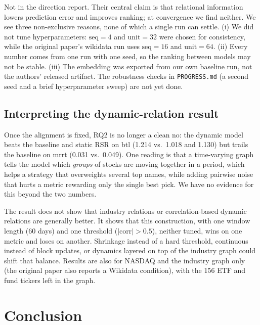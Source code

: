 \documentclass[12pt]{article}
\begin{document}
Not in the direction \citet{feng2019temporal} report. Their central claim is that relational
information lowers prediction error and improves ranking; at convergence we find neither. We see
three non-exclusive reasons, none of which a single run can settle. (i) We did not tune
hyperparameters: $\text{seq}=4$ and $\text{unit}=32$ were chosen for consistency, while the
original paper's wikidata run uses $\text{seq}=16$ and $\text{unit}=64$. (ii) Every number comes
from one run with one seed, so the ranking between models may not be stable. (iii) The embedding
was exported from our own baseline run, not the authors' released artifact. The robustness checks
in \texttt{PROGRESS.md} (a second seed and a brief hyperparameter sweep) are not yet done.

\subsection{Interpreting the dynamic-relation result}
\label{sec:discussion}

Once the alignment is fixed, RQ2 is no longer a clean no: the dynamic model beats the baseline
and static RSR on btl (1.214 vs.\ 1.018 and 1.130) but trails the baseline on mrrt (0.031 vs.\
0.049). One reading is that a time-varying graph tells the model which \emph{groups} of stocks are
moving together in a period, which helps a strategy that overweights several top names, while
adding pairwise noise that hurts a metric rewarding only the single best pick. We have no
evidence for this beyond the two numbers.

The result does not show that industry relations or correlation-based dynamic relations are
generally better. It shows that this construction, with one window length (60 days) and one
threshold ($|\text{corr}|>0.5$), neither tuned, wins on one metric and loses on another. Shrinkage
instead of a hard threshold, continuous instead of block updates, or dynamics layered on top of the
industry graph could shift that balance. Results are also for NASDAQ and the industry graph only
(the original paper also reports a Wikidata condition), with the 156 ETF and fund tickers left in
the graph.


\section{Conclusion}
\label{sec:conclusion}
\end{document}
